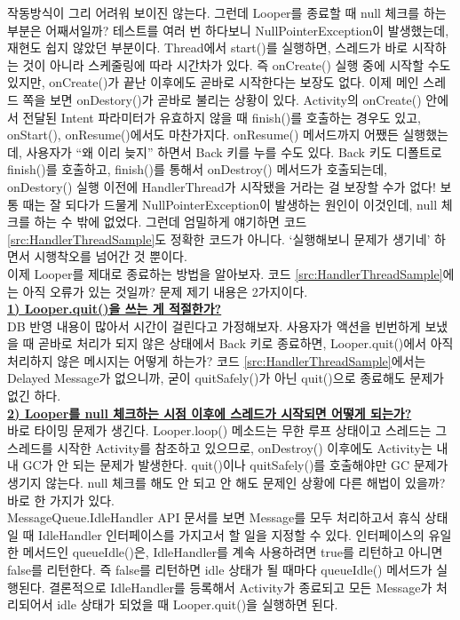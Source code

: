 작동방식이 그리 어려워 보이진 않는다.
그런데 Looper를 종료할 때 null 체크를 하는 부분은 어째서일까? 
테스트를 여러 번 하다보니 NullPointerException이 발생했는데, 재현도 쉽지 않았던 부분이다. 
Thread에서 start()를 실행하면, 스레드가 바로 시작하는 것이 아니라 스케줄링에 따라 시간차가 있다. 
즉 onCreate() 실행 중에 시작할 수도 있지만, onCreate()가 끝난 이후에도 곧바로 시작한다는 보장도 없다.
이제 메인 스레드 쪽을 보면 onDestory()가 곧바로 불리는 상황이 있다. 
Activity의 onCreate() 안에서 전달된 Intent 파라미터가 유효하지 않을 때 finish()를 호출하는 경우도 있고, onStart(), onResume()에서도 마찬가지다. 
onResume() 메서드까지 어쨌든 실행했는데, 사용자가 ``왜 이리 늦지'' 하면서 Back 키를 누를 수도 있다. Back 키도 디폴트로 finish()를 호출하고, 
finish()를 통해서 onDestroy() 메서드가 호출되는데, onDestory() 실행 이전에 HandlerThread가 시작됐을 거라는 걸 보장할 수가 없다!
보통 때는 잘 되다가 드물게 NullPointerException이 발생하는 원인이 이것인데, null 체크를 하는 수 밖에 없었다.
그런데 엄밀하게 얘기하면 코드 \ref{src:HandlerThreadSample}도 정확한 코드가 아니다. 
`실행해보니 문제가 생기네' 하면서 시행착오를 넘어간 것 뿐이다.\\

이제 Looper를 제대로 종료하는 방법을 알아보자. 코드 \ref{src:HandlerThreadSample}에는 아직 오류가 있는 것일까?
문제 제기 내용은 2가지이다.\\

\underline{\bfseries 1) Looper.quit()을 쓰는 게 적절한가?}\\
DB 반영 내용이 많아서 시간이 걸린다고 가정해보자. 
사용자가 액션을 빈번하게 보냈을 때 곧바로 처리가 되지 않은 상태에서 Back 키로 종료하면, Looper.quit()에서 아직 처리하지 않은 메시지는 어떻게 하는가?
코드 \ref{src:HandlerThreadSample}에서는 Delayed Message가 없으니까, 굳이 quitSafely()가 아닌 quit()으로 종료해도 문제가 없긴 하다.\\

\underline{\bfseries 2) Looper를 null 체크하는 시점 이후에 스레드가 시작되면 어떻게 되는가?}\\
바로 타이밍 문제가 생긴다. 
Looper.loop() 메소드는 무한 루프 상태이고 스레드는 그 스레드를 시작한 Activity를 참조하고 있으므로, onDestroy() 이후에도 Activity는 내내 GC가 안 되는 문제가 발생한다.
quit()이나 quitSafely()를 호출해야만 GC 문제가 생기지 않는다.
null 체크를 해도 안 되고 안 해도 문제인 상황에 다른 해법이 있을까?
바로 한 가지가 있다.\\

MessageQueue.IdleHandler API 문서를 보면 Message를 모두 처리하고서 휴식 상태일 때 IdleHandler 인터페이스를 가지고서 할 일을 지정할 수 있다.
인터페이스의 유일한 메서드인 queueIdle()은, IdleHandler를 계속 사용하려면 true를 리턴하고 아니면 false를 리턴한다. 즉 false를 리턴하면 idle 상태가 될 때마다 queueIdle() 메서드가 실행된다.
결론적으로 IdleHandler를 등록해서 Activity가 종료되고 모든 Message가 처리되어서 idle 상태가 되었을 때 Looper.quit()을 실행하면 된다.\\

